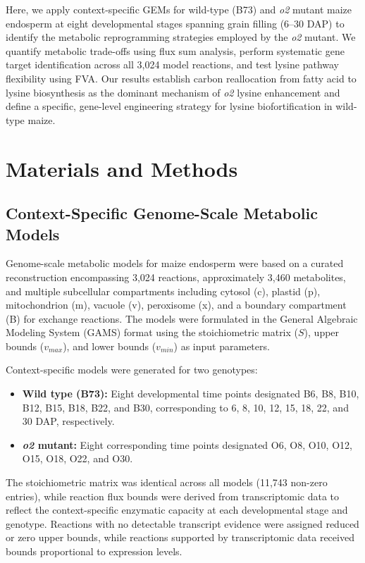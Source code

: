 \documentclass[12pt,a4paper]{article}
\begin{document}
Here, we apply context-specific GEMs for wild-type (B73) and \textit{o2} mutant maize endosperm at eight developmental stages spanning grain filling (6--30 DAP) to identify the metabolic reprogramming strategies employed by the \textit{o2} mutant. We quantify metabolic trade-offs using flux sum analysis, perform systematic gene target identification across all 3,024 model reactions, and test lysine pathway flexibility using FVA. Our results establish carbon reallocation from fatty acid to lysine biosynthesis as the dominant mechanism of \textit{o2} lysine enhancement and define a specific, gene-level engineering strategy for lysine biofortification in wild-type maize.

\section{Materials and Methods}

\subsection{Context-Specific Genome-Scale Metabolic Models}

Genome-scale metabolic models for maize endosperm were based on a curated reconstruction encompassing 3,024 reactions, approximately 3,460 metabolites, and multiple subcellular compartments including cytosol (c), plastid (p), mitochondrion (m), vacuole (v), peroxisome (x), and a boundary compartment (B) for exchange reactions. The models were formulated in the General Algebraic Modeling System (GAMS) format using the stoichiometric matrix ($S$), upper bounds ($v_{max}$), and lower bounds ($v_{min}$) as input parameters.

Context-specific models were generated for two genotypes:
\begin{itemize}
    \item \textbf{Wild type (B73):} Eight developmental time points designated B6, B8, B10, B12, B15, B18, B22, and B30, corresponding to 6, 8, 10, 12, 15, 18, 22, and 30 DAP, respectively.
    \item \textbf{\textit{o2} mutant:} Eight corresponding time points designated O6, O8, O10, O12, O15, O18, O22, and O30.
\end{itemize}

The stoichiometric matrix was identical across all models (11,743 non-zero entries), while reaction flux bounds were derived from transcriptomic data to reflect the context-specific enzymatic capacity at each developmental stage and genotype. Reactions with no detectable transcript evidence were assigned reduced or zero upper bounds, while reactions supported by transcriptomic data received bounds proportional to expression levels.
\end{document}
